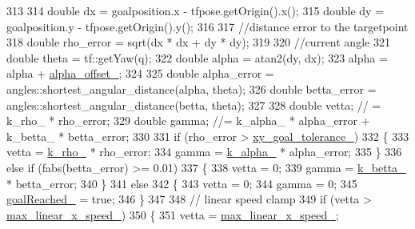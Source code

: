 \begin{DoxyCode}
{313 
314     \textcolor{keywordtype}{double} dx = goalposition.x - tfpose.getOrigin().x();
315     \textcolor{keywordtype}{double} dy = goalposition.y - tfpose.getOrigin().y();
316 
317     \textcolor{comment}{//distance error to the targetpoint}
318     \textcolor{keywordtype}{double} rho\_error = sqrt(dx * dx + dy * dy);
319 
320     \textcolor{comment}{//current angle}
321     \textcolor{keywordtype}{double} theta = tf::getYaw(q);
322     \textcolor{keywordtype}{double} alpha = atan2(dy, dx);
323     alpha = alpha + \hyperlink{classmove__base__z__client_1_1forward__local__planner_1_1ForwardLocalPlanner_a358adfdd02866b413518dee9d5212b8f}{alpha\_offset\_};
324 
325     \textcolor{keywordtype}{double} alpha\_error = angles::shortest\_angular\_distance(alpha, theta);
326     \textcolor{keywordtype}{double} betta\_error = angles::shortest\_angular\_distance(betta, theta);
327 
328     \textcolor{keywordtype}{double} vetta; \textcolor{comment}{// = k\_rho\_ * rho\_error;}
329     \textcolor{keywordtype}{double} gamma; \textcolor{comment}{//= k\_alpha\_ * alpha\_error + k\_betta\_ * betta\_error;}
330 
331     \textcolor{keywordflow}{if} (rho\_error > \hyperlink{classmove__base__z__client_1_1forward__local__planner_1_1ForwardLocalPlanner_a462f6c9011e538965326add2dfb7529d}{xy\_goal\_tolerance\_})
332     \{
333         vetta = \hyperlink{classmove__base__z__client_1_1forward__local__planner_1_1ForwardLocalPlanner_a1b54015059a753c82b1856dc289c1c15}{k\_rho\_} * rho\_error;
334         gamma = \hyperlink{classmove__base__z__client_1_1forward__local__planner_1_1ForwardLocalPlanner_a850d27109bd2036abb7ab0a25a4f7f84}{k\_alpha\_} * alpha\_error;
335     \}
336     \textcolor{keywordflow}{else} \textcolor{keywordflow}{if} (fabs(betta\_error) >= 0.01)
337     \{
338         vetta = 0;
339         gamma = \hyperlink{classmove__base__z__client_1_1forward__local__planner_1_1ForwardLocalPlanner_a3f5712d51ff58633cbffe40cb5608b72}{k\_betta\_} * betta\_error;
340     \}
341     \textcolor{keywordflow}{else}
342     \{
343         vetta = 0;
344         gamma = 0;
345         \hyperlink{classmove__base__z__client_1_1forward__local__planner_1_1ForwardLocalPlanner_a2c86f8381cc3b8677f95f32ae6939023}{goalReached\_} = \textcolor{keyword}{true};
346     \}
347 
348     \textcolor{comment}{// linear speed clamp}
349     \textcolor{keywordflow}{if} (vetta > \hyperlink{classmove__base__z__client_1_1forward__local__planner_1_1ForwardLocalPlanner_ad08d97c8679f1da4455de4e03e1861ae}{max\_linear\_x\_speed\_})
350     \{
351         vetta = \hyperlink{classmove__base__z__client_1_1forward__local__planner_1_1ForwardLocalPlanner_ad08d97c8679f1da4455de4e03e1861ae}{max\_linear\_x\_speed\_};
}
\end{DoxyCode}
